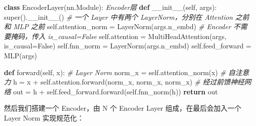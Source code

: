 \documentclass[
]{article}
\newenvironment{Shaded}{}{}
\newcommand{\BuiltInTok}[1]{\textcolor[rgb]{0.00,0.50,0.00}{#1}}
\newcommand{\CommentTok}[1]{\textcolor[rgb]{0.38,0.63,0.69}{\textit{#1}}}
\newcommand{\ControlFlowTok}[1]{\textcolor[rgb]{0.00,0.44,0.13}{\textbf{#1}}}
\newcommand{\FunctionTok}[1]{\textcolor[rgb]{0.02,0.16,0.49}{#1}}
\newcommand{\KeywordTok}[1]{\textcolor[rgb]{0.00,0.44,0.13}{\textbf{#1}}}
\newcommand{\NormalTok}[1]{#1}
\newcommand{\OperatorTok}[1]{\textcolor[rgb]{0.40,0.40,0.40}{#1}}
\newcommand{\VariableTok}[1]{\textcolor[rgb]{0.10,0.09,0.49}{#1}}
\begin{document}
\begin{Shaded}
\begin{Highlighting}[]
\KeywordTok{class}\NormalTok{ EncoderLayer(nn.Module):}
  \CommentTok{\textquotesingle{}\textquotesingle{}\textquotesingle{}Encoder层\textquotesingle{}\textquotesingle{}\textquotesingle{}}
    \KeywordTok{def} \FunctionTok{\_\_init\_\_}\NormalTok{(}\VariableTok{self}\NormalTok{, args):}
        \BuiltInTok{super}\NormalTok{().}\FunctionTok{\_\_init\_\_}\NormalTok{()}
        \CommentTok{\# 一个 Layer 中有两个 LayerNorm，分别在 Attention 之前和 MLP 之前}
        \VariableTok{self}\NormalTok{.attention\_norm }\OperatorTok{=}\NormalTok{ LayerNorm(args.n\_embd)}
        \CommentTok{\# Encoder 不需要掩码，传入 is\_causal=False}
        \VariableTok{self}\NormalTok{.attention }\OperatorTok{=}\NormalTok{ MultiHeadAttention(args, is\_causal}\OperatorTok{=}\VariableTok{False}\NormalTok{)}
        \VariableTok{self}\NormalTok{.fnn\_norm }\OperatorTok{=}\NormalTok{ LayerNorm(args.n\_embd)}
        \VariableTok{self}\NormalTok{.feed\_forward }\OperatorTok{=}\NormalTok{ MLP(args)}

    \KeywordTok{def}\NormalTok{ forward(}\VariableTok{self}\NormalTok{, x):}
        \CommentTok{\# Layer Norm}
\NormalTok{        norm\_x }\OperatorTok{=} \VariableTok{self}\NormalTok{.attention\_norm(x)}
        \CommentTok{\# 自注意力}
\NormalTok{        h }\OperatorTok{=}\NormalTok{ x }\OperatorTok{+} \VariableTok{self}\NormalTok{.attention.forward(norm\_x, norm\_x, norm\_x)}
        \CommentTok{\# 经过前馈神经网络}
\NormalTok{        out }\OperatorTok{=}\NormalTok{ h }\OperatorTok{+} \VariableTok{self}\NormalTok{.feed\_forward.forward(}\VariableTok{self}\NormalTok{.fnn\_norm(h))}
        \ControlFlowTok{return}\NormalTok{ out}
\end{Highlighting}
\end{Shaded}

然后我们搭建一个 Encoder，由 N 个 Encoder Layer 组成，在最后会加入一个
Layer Norm 实现规范化：
\end{document}
